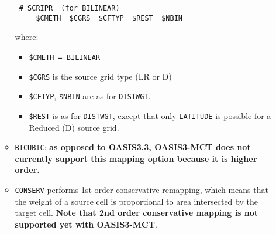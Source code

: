 \begin{itemize}
\begin{itemize}
  \begin{verbatim}
 # SCRIPR  (for BILINEAR)
     $CMETH  $CGRS  $CFTYP  $REST  $NBIN
  \end{verbatim}
\vspace{-0.5cm} 
where:
  \begin{itemize}
  \item {\tt \$CMETH = BILINEAR}
  \item {\tt \$CGRS} is the source grid type (LR or D)
  \item {\tt \$CFTYP}, {\tt \$NBIN} are
  as for {\tt DISTWGT}. 
  \item {\tt \$REST} is as for {\tt DISTWGT}, except that only
  {\tt LATITUDE} is possible for a Reduced (D) source grid.
  \end{itemize}
 
  \item {\tt BICUBIC}: {\bf as opposed to OASIS3.3, OASIS3-MCT does not
    currently support this mapping option because it is higher
    order.} 

  \item {\tt CONSERV} performs 1st order conservative remapping,
  which means that the weight of a source cell is proportional to area
  intersected by the target cell.  {\bf Note that 2nd order conservative mapping
  is not supported yet with OASIS3-MCT}.


\end{itemize}
\end{itemize}
